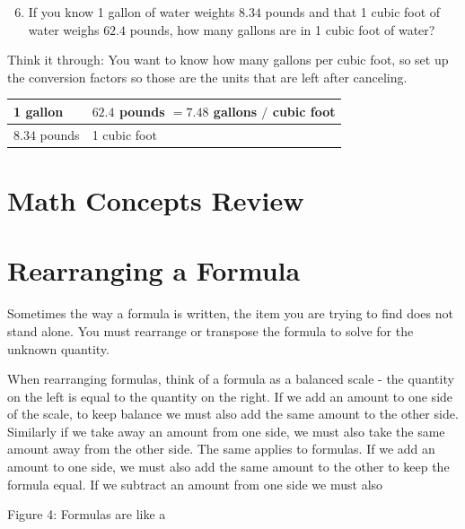 \documentclass[10pt]{article}
\begin{document}
\begin{enumerate}
  \setcounter{enumi}{5}
  \item If you know 1 gallon of water weights $8.34$ pounds and that 1 cubic foot of water weighs $62.4$ pounds, how many gallons are in 1 cubic foot of water?
\end{enumerate}
Think it through: You want to know how many gallons per cubic foot, so set up the conversion factors so those are the units that are left after canceling.

\begin{tabular}{l|l}
1 gallon & $62.4$ pounds $=7.48$ gallons $/$ cubic foot \\
\hline
$8.34$ pounds & 1 cubic foot \\
\hline
\end{tabular}

\section{Math Concepts Review}
\section{Rearranging a Formula}
Sometimes the way a formula is written, the item you are trying to find does not stand alone. You must rearrange or transpose the formula to solve for the unknown quantity.

When rearranging formulas, think of a formula as a balanced scale - the quantity on the left is equal to the quantity on the right. If we add an amount to one side of the scale, to keep balance we must also add the same amount to the other side. Similarly if we take away an amount from one side, we must also take the same amount away from the other side. The same applies to formulas. If we add an amount to one side, we must also add the same amount to the other to keep the formula equal. If we subtract an amount from one side we must also

Figure 4: Formulas are like a
\end{document}

